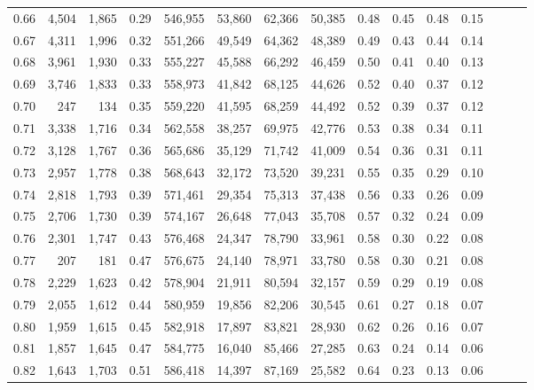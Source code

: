\begin{tabular}{rrrrrrrrrrrrrrr}
0.66 &   4,504 &  1,865 &  0.29 &  546,955 &   53,860 &   62,366 &   50,385 &  0.48 &  0.45 &  0.48 &      0.15 \\
0.67 &   4,311 &  1,996 &  0.32 &  551,266 &   49,549 &   64,362 &   48,389 &  0.49 &  0.43 &  0.44 &      0.14 \\
0.68 &   3,961 &  1,930 &  0.33 &  555,227 &   45,588 &   66,292 &   46,459 &  0.50 &  0.41 &  0.40 &      0.13 \\
0.69 &   3,746 &  1,833 &  0.33 &  558,973 &   41,842 &   68,125 &   44,626 &  0.52 &  0.40 &  0.37 &      0.12 \\
0.70 &     247 &    134 &  0.35 &  559,220 &   41,595 &   68,259 &   44,492 &  0.52 &  0.39 &  0.37 &      0.12 \\
0.71 &   3,338 &  1,716 &  0.34 &  562,558 &   38,257 &   69,975 &   42,776 &  0.53 &  0.38 &  0.34 &      0.11 \\
0.72 &   3,128 &  1,767 &  0.36 &  565,686 &   35,129 &   71,742 &   41,009 &  0.54 &  0.36 &  0.31 &      0.11 \\
0.73 &   2,957 &  1,778 &  0.38 &  568,643 &   32,172 &   73,520 &   39,231 &  0.55 &  0.35 &  0.29 &      0.10 \\
0.74 &   2,818 &  1,793 &  0.39 &  571,461 &   29,354 &   75,313 &   37,438 &  0.56 &  0.33 &  0.26 &      0.09 \\
0.75 &   2,706 &  1,730 &  0.39 &  574,167 &   26,648 &   77,043 &   35,708 &  0.57 &  0.32 &  0.24 &      0.09 \\
0.76 &   2,301 &  1,747 &  0.43 &  576,468 &   24,347 &   78,790 &   33,961 &  0.58 &  0.30 &  0.22 &      0.08 \\
0.77 &     207 &    181 &  0.47 &  576,675 &   24,140 &   78,971 &   33,780 &  0.58 &  0.30 &  0.21 &      0.08 \\
0.78 &   2,229 &  1,623 &  0.42 &  578,904 &   21,911 &   80,594 &   32,157 &  0.59 &  0.29 &  0.19 &      0.08 \\
0.79 &   2,055 &  1,612 &  0.44 &  580,959 &   19,856 &   82,206 &   30,545 &  0.61 &  0.27 &  0.18 &      0.07 \\
0.80 &   1,959 &  1,615 &  0.45 &  582,918 &   17,897 &   83,821 &   28,930 &  0.62 &  0.26 &  0.16 &      0.07 \\
0.81 &   1,857 &  1,645 &  0.47 &  584,775 &   16,040 &   85,466 &   27,285 &  0.63 &  0.24 &  0.14 &      0.06 \\
0.82 &   1,643 &  1,703 &  0.51 &  586,418 &   14,397 &   87,169 &   25,582 &  0.64 &  0.23 &  0.13 &      0.06 \\

\end{tabular}
